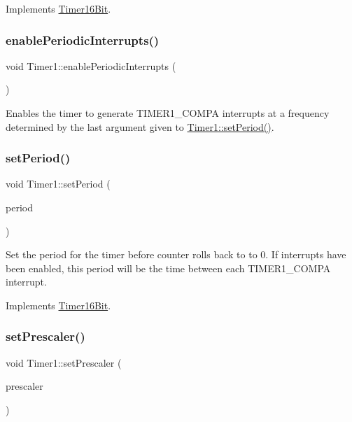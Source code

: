 Implements \mbox{\hyperlink{class_timer16_bit}{Timer16\+Bit}}.

\mbox{\label{class_timer1_adffa570f7391a22de1f6ae1673cd2861}} 
\subsubsection{\texorpdfstring{enablePeriodicInterrupts()}{enablePeriodicInterrupts()}}
{\footnotesize\ttfamily void Timer1\+::enable\+Periodic\+Interrupts (\begin{DoxyParamCaption}{ }\end{DoxyParamCaption})}

Enables the timer to generate T\+I\+M\+E\+R1\+\_\+\+C\+O\+M\+PA interrupts at a frequency determined by the last argument given to \mbox{\hyperlink{class_timer1_a0aa1eeb582f2a3360f2cb53678c726f9}{Timer1\+::set\+Period()}}. \mbox{\label{class_timer1_a0aa1eeb582f2a3360f2cb53678c726f9}} 
\subsubsection{\texorpdfstring{setPeriod()}{setPeriod()}}
{\footnotesize\ttfamily void Timer1\+::set\+Period (\begin{DoxyParamCaption}\item[{u16}]{period }\end{DoxyParamCaption})\hspace{0.3cm}{\ttfamily [virtual]}}

Set the period for the timer before counter rolls back to to 0. If interrupts have been enabled, this period will be the time between each T\+I\+M\+E\+R1\+\_\+\+C\+O\+M\+PA interrupt. 

Implements \mbox{\hyperlink{class_timer16_bit}{Timer16\+Bit}}.

\mbox{\label{class_timer1_a4e841a09f12c8de397440cf6cd74fa4b}} 
\subsubsection{\texorpdfstring{setPrescaler()}{setPrescaler()}}
{\footnotesize\ttfamily void Timer1\+::set\+Prescaler (\begin{DoxyParamCaption}\item[{Prescale\+Option}]{prescaler }\end{DoxyParamCaption})\hspace{0.3cm}{\ttfamily [virtual]}}

